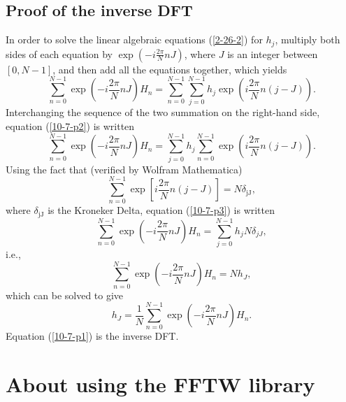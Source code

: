 \documentclass{article}
\newcommand{\tmop}[1]{\ensuremath{\operatorname{#1}}}
\begin{document}
\subsection{Proof of the inverse DFT}\label{10-7-p5}

In order to solve the linear algebraic equations (\ref{2-26-2}) for $h_j$,
multiply both sides of each equation by $\exp \left( - i \frac{2 \pi}{N} n J
\right)$, where $J$ is an integer between $[0, N - 1]$, and then add all the
equations together, which yields
\begin{equation}
  \label{10-7-p2} \sum_{n = 0}^{N - 1} \exp \left( - i \frac{2 \pi}{N} n J
  \right) H_n = \sum_{n = 0}^{N - 1} \sum_{j = 0}^{N - 1} h_j \exp \left( i
  \frac{2 \pi}{N} n (j - J) \right) .
\end{equation}
Interchanging the sequence of the two summation on the right-hand side,
equation (\ref{10-7-p2}) is written
\begin{equation}
  \label{10-7-p3} \sum_{n = 0}^{N - 1} \exp \left( - i \frac{2 \pi}{N} n J
  \right) H_n = \sum_{j = 0}^{N - 1} h_j \sum_{n = 0}^{N - 1} \exp \left( i
  \frac{2 \pi}{N} n (j - J) \right) .
\end{equation}
Using the fact that (verified by Wolfram Mathematica)
\begin{equation}
  \sum_{n = 0}^{N - 1} \exp \left[ i \frac{2 \pi}{N} n (j - J) \right] = N
  \delta_{\tmop{jJ}},
\end{equation}
where $\delta_{\tmop{jJ}}$ is the Kroneker Delta, equation (\ref{10-7-p3}) is
written
\begin{equation}
  \sum_{n = 0}^{N - 1} \exp \left( - i \frac{2 \pi}{N} n J \right) H_n =
  \sum_{j = 0}^{N - 1} h_j N \delta_{j J},
\end{equation}
i.e.,
\begin{equation}
  \sum_{n = 0}^{N - 1} \exp \left( - i \frac{2 \pi}{N} n J \right) H_n = N
  h_J,
\end{equation}
which can be solved to give
\begin{equation}
  \label{10-7-p1} h_J = \frac{1}{N} \sum_{n = 0}^{N - 1} \exp \left( - i
  \frac{2 \pi}{N} n J \right) H_n .
\end{equation}
Equation (\ref{10-7-p1}) is the inverse DFT.

\section{About using the FFTW library}
\end{document}
